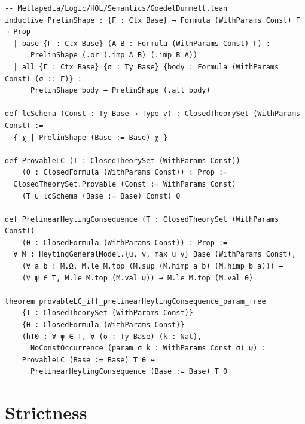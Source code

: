 \documentclass[11pt]{article}
\theoremstyle{plain}
\theoremstyle{definition}
\begin{document}
\begin{lstlisting}
-- Mettapedia/Logic/HOL/Semantics/GoedelDummett.lean
inductive PrelinShape : {Γ : Ctx Base} → Formula (WithParams Const) Γ → Prop
  | base {Γ : Ctx Base} (A B : Formula (WithParams Const) Γ) :
      PrelinShape (.or (.imp A B) (.imp B A))
  | all {Γ : Ctx Base} {σ : Ty Base} {body : Formula (WithParams Const) (σ :: Γ)} :
      PrelinShape body → PrelinShape (.all body)

def lcSchema (Const : Ty Base → Type v) : ClosedTheorySet (WithParams Const) :=
  { χ | PrelinShape (Base := Base) χ }

def ProvableLC (T : ClosedTheorySet (WithParams Const))
    (θ : ClosedFormula (WithParams Const)) : Prop :=
  ClosedTheorySet.Provable (Const := WithParams Const)
    (T ∪ lcSchema (Base := Base) Const) θ

def PrelinearHeytingConsequence (T : ClosedTheorySet (WithParams Const))
    (θ : ClosedFormula (WithParams Const)) : Prop :=
  ∀ M : HeytingGeneralModel.{u, v, max u v} Base (WithParams Const),
    (∀ a b : M.Ω, M.le M.top (M.sup (M.himp a b) (M.himp b a))) →
    (∀ ψ ∈ T, M.le M.top (M.val ψ)) → M.le M.top (M.val θ)

theorem provableLC_iff_prelinearHeytingConsequence_param_free
    {T : ClosedTheorySet (WithParams Const)}
    {θ : ClosedFormula (WithParams Const)}
    (hT0 : ∀ ψ ∈ T, ∀ (σ : Ty Base) (k : Nat),
      NoConstOccurrence (param σ k : WithParams Const σ) ψ) :
    ProvableLC (Base := Base) T θ ↔
      PrelinearHeytingConsequence (Base := Base) T θ
\end{lstlisting}

\section{Strictness}\label{sec:strictness}
\end{document}
